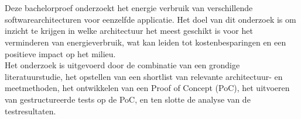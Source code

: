 
%
%
%
%
%

%



\chapter*{}
Deze bachelorproef onderzoekt het energie verbruik van verschillende softwarearchitecturen voor eenzelfde applicatie. Het doel van dit onderzoek is om inzicht te krijgen in welke architectuur het meest geschikt is voor het verminderen van energieverbruik, wat kan leiden tot kostenbesparingen en een positieve impact op het milieu.\\

Het onderzoek is uitgevoerd door de combinatie van een grondige literatuurstudie, het opstellen van een shortlist van relevante architectuur- en meetmethoden, het ontwikkelen van een Proof of Concept (PoC), het uitvoeren van gestructureerde tests op de PoC, en ten slotte de analyse van de testresultaten.\\

